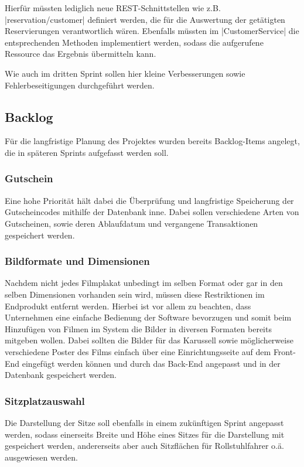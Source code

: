 Hierfür müssten lediglich neue \acs{REST}-Schnittstellen wie z.B. \jinline|reservation/customer| definiert werden, die für die Auswertung der getätigten Reservierungen verantwortlich wären.
Ebenfalls müssten im \jinline|CustomerService| die entsprechenden Methoden implementiert werden, sodass die aufgerufene Ressource das Ergebnis übermitteln kann.

Wie auch im dritten Sprint sollen hier kleine Verbesserungen sowie Fehlerbeseitigungen durchgeführt werden.

\subsection{Backlog}
\label{ssec:backlog}
\multipleauthorsection{\authorRF}{\authorEJ}
Für die langfristige Planung des Projektes wurden bereits Backlog-Items angelegt, die in späteren Sprints aufgefasst werden soll.

\subsubsection*{Gutschein}
\label{ssssec:gutschein}
Eine hohe Priorität hält dabei die Überprüfung und langfristige Speicherung der Gutscheincodes mithilfe der Datenbank inne.
Dabei sollen verschiedene Arten von Gutscheinen, sowie deren Ablaufdatum und vergangene Transaktionen gespeichert werden.

\subsubsection*{Bildformate und Dimensionen}
\label{ssssec:bildformatedimensionen}
Nachdem nicht jedes Filmplakat unbedingt im selben Format oder gar in den selben Dimensionen vorhanden sein wird, müssen diese Restriktionen im Endprodukt entfernt werden.
Hierbei ist vor allem zu beachten, dass Unternehmen eine einfache Bedienung der Software bevorzugen und somit beim Hinzufügen von Filmen im System die Bilder in diversen Formaten bereits mitgeben wollen.
Dabei sollten die Bilder für das Karussell sowie möglicherweise verschiedene Poster des Films einfach über eine Einrichtungsseite auf dem Front-End eingefügt werden können und durch das Back-End angepasst und in der Datenbank gespeichert werden.

\subsubsection*{Sitzplatzauswahl}
\label{ssssec:sitzplatzauswahl}
Die Darstellung der Sitze soll ebenfalls in einem zukünftigen Sprint angepasst werden, sodass einerseits Breite und Höhe eines Sitzes für die Darstellung mit gespeichert werden, andererseits aber auch Sitzflächen für Rollstuhlfahrer o.ä. ausgewiesen werden.

